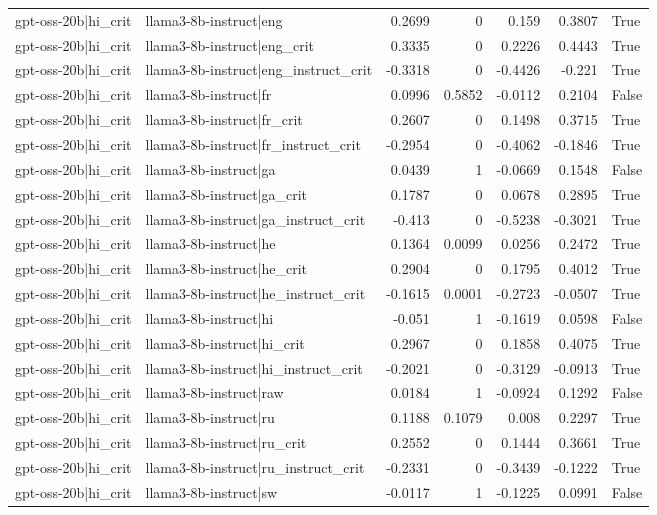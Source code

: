 \begin{table}
\begin{tabular}{l l r r r r l}
gpt-oss-20b|hi_crit & llama3-8b-instruct|eng & 0.2699 & 0 & 0.159 & 0.3807 & True \\
gpt-oss-20b|hi_crit & llama3-8b-instruct|eng_crit & 0.3335 & 0 & 0.2226 & 0.4443 & True \\
gpt-oss-20b|hi_crit & llama3-8b-instruct|eng_instruct_crit & -0.3318 & 0 & -0.4426 & -0.221 & True \\
gpt-oss-20b|hi_crit & llama3-8b-instruct|fr & 0.0996 & 0.5852 & -0.0112 & 0.2104 & False \\
gpt-oss-20b|hi_crit & llama3-8b-instruct|fr_crit & 0.2607 & 0 & 0.1498 & 0.3715 & True \\
gpt-oss-20b|hi_crit & llama3-8b-instruct|fr_instruct_crit & -0.2954 & 0 & -0.4062 & -0.1846 & True \\
gpt-oss-20b|hi_crit & llama3-8b-instruct|ga & 0.0439 & 1 & -0.0669 & 0.1548 & False \\
gpt-oss-20b|hi_crit & llama3-8b-instruct|ga_crit & 0.1787 & 0 & 0.0678 & 0.2895 & True \\
gpt-oss-20b|hi_crit & llama3-8b-instruct|ga_instruct_crit & -0.413 & 0 & -0.5238 & -0.3021 & True \\
gpt-oss-20b|hi_crit & llama3-8b-instruct|he & 0.1364 & 0.0099 & 0.0256 & 0.2472 & True \\
gpt-oss-20b|hi_crit & llama3-8b-instruct|he_crit & 0.2904 & 0 & 0.1795 & 0.4012 & True \\
gpt-oss-20b|hi_crit & llama3-8b-instruct|he_instruct_crit & -0.1615 & 0.0001 & -0.2723 & -0.0507 & True \\
gpt-oss-20b|hi_crit & llama3-8b-instruct|hi & -0.051 & 1 & -0.1619 & 0.0598 & False \\
gpt-oss-20b|hi_crit & llama3-8b-instruct|hi_crit & 0.2967 & 0 & 0.1858 & 0.4075 & True \\
gpt-oss-20b|hi_crit & llama3-8b-instruct|hi_instruct_crit & -0.2021 & 0 & -0.3129 & -0.0913 & True \\
gpt-oss-20b|hi_crit & llama3-8b-instruct|raw & 0.0184 & 1 & -0.0924 & 0.1292 & False \\
gpt-oss-20b|hi_crit & llama3-8b-instruct|ru & 0.1188 & 0.1079 & 0.008 & 0.2297 & True \\
gpt-oss-20b|hi_crit & llama3-8b-instruct|ru_crit & 0.2552 & 0 & 0.1444 & 0.3661 & True \\
gpt-oss-20b|hi_crit & llama3-8b-instruct|ru_instruct_crit & -0.2331 & 0 & -0.3439 & -0.1222 & True \\
gpt-oss-20b|hi_crit & llama3-8b-instruct|sw & -0.0117 & 1 & -0.1225 & 0.0991 & False \\

\end{tabular}
\end{table}
